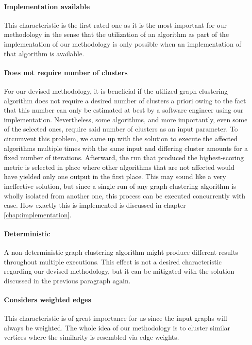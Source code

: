 \documentclass[12pt,a4paper]{report}
\begin{document}
\paragraph{Implementation available}
This characteristic is the first rated one
as it is the most important for our methodology in the sense that the
utilization of an algorithm as part of the implementation of our methodology is
only possible when an implementation of that algorithm is available.

\paragraph{Does not require number of clusters} \label{graph-clustering-algorithm-survey-amount-of-clusters}
For our devised methodology, it is
beneficial if the utilized graph clustering algorithm does not require a
desired number of clusters a priori owing to the fact that this number can only
be estimated at best by a software engineer using our implementation.
Nevertheless, some algorithms, and more importantly, even some of the selected
ones, require said number of clusters as an input parameter. To circumvent this
problem, we came up with the solution to execute the affected algorithms
multiple times with the same input and differing cluster amounts for a fixed
number of iterations. Afterward, the run that produced the highest-scoring
metric is selected in place where other algorithms that are not affected would
have yielded only one output in the first place. This may sound like a very
ineffective solution, but since a single run of any graph clustering algorithm
is wholly isolated from another one, this process can be executed concurrently
with ease. How exactly this is implemented is discussed in chapter
\ref{chap:implementation}.

\paragraph{Deterministic}
A non\hyp deterministic graph clustering algorithm
might produce different results throughout multiple executions. This effect is
not a desired characteristic regarding our devised methodology, but it can be
mitigated with the solution discussed in the previous paragraph again.

\paragraph{Considers weighted edges}
This characteristic is of great importance
for us since the input graphs will always be weighted. The whole
idea of our methodology is to cluster similar vertices where the similarity is
resembled via edge weights.
\end{document}
